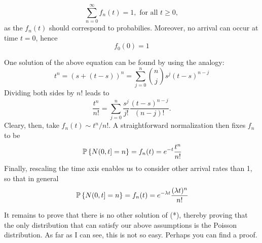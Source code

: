\begin{question}[use=false]
\begin{solution}
\begin{equation*}
   \sum_{n=0}^\infty f_n(t) = 1, \text{ for all } t\geq 0,
\end{equation*}
as the $f_n(t)$ should correspond to probabilies. Moreover, no arrival
can occur at time $t=0$, hence
\begin{equation*}
   f_0(0) = 1
\end{equation*}


One solution of the above equation  can be found by using the analogy:
\begin{equation*}
   t^n = (s + (t-s) )^n = \sum_{j=0}^n {n \choose j} s^j (t-s)^{n-j}
\end{equation*}
Dividing both sides by $n!$ leads to 
\begin{equation*}
   \frac{t^n}{n!} = \sum_{j=0}^n \frac{s^j}{j!}\frac{(t-s)^{n-j}}{(n-j)!}. 
\end{equation*}
Cleary, then, take $f_n(t) \sim t^n/n!$. A straightforward
normalization then fixes $f_n$ to be
\begin{equation*}
   \P{N(0,t] = n } = f_n(t) = e^{-t} \frac{t^n}{n!}
\end{equation*}
Finally, rescaling the time axis enables us to consider other arrival
rates than 1, so that in general
\begin{equation*}
   \P{N(0,t] = n } = f_n(t) = e^{-\lambda t} \frac{(\lambda t)^n}{n!}
\end{equation*}

It remains to prove that there is no other solution of (*), thereby
proving that the only distribution that can satisfy our above
assumptions is the Poisson distribution.  As far as I can see, this is
not so easy. Perhaps you can find a proof.




 \end{solution}
\end{question}


